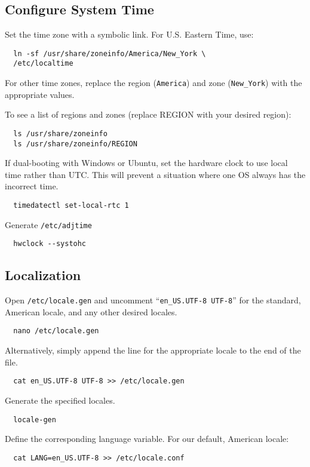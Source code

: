 \documentclass[letterpaper,12pt]{article}
\newcommand{\p}{\par\bigskip}
\begin{document}
\subsection{Configure System Time}
Set the time zone with a symbolic link. For U.S. Eastern Time, use:
\begin{lstlisting}
  ln -sf /usr/share/zoneinfo/America/New_York \
  /etc/localtime
\end{lstlisting} \p
For other time zones, replace the region ({\tt America}) and zone ({\tt New\_York}) with the appropriate values. \par

To see a list of regions and zones (replace REGION with your desired region):
\begin{lstlisting}
  ls /usr/share/zoneinfo
  ls /usr/share/zoneinfo/REGION
\end{lstlisting} \p

If dual-booting with Windows or Ubuntu, set the hardware clock to use local time rather than UTC. This will prevent a situation where one OS always has the incorrect time.
\begin{lstlisting}
  timedatectl set-local-rtc 1
\end{lstlisting} \p

Generate {\tt /etc/adjtime}
\begin{lstlisting}
  hwclock --systohc
\end{lstlisting}


\subsection{Localization}
Open {\tt /etc/locale.gen} and uncomment ``{\tt en\_US.UTF-8 UTF-8}'' for the standard, American locale, and any other desired locales.
\begin{lstlisting}
  nano /etc/locale.gen
\end{lstlisting} \p

Alternatively, simply append the line for the appropriate locale to the end of the file.
\begin{lstlisting}
  cat en_US.UTF-8 UTF-8 >> /etc/locale.gen
\end{lstlisting} \p

Generate the specified locales.
\begin{lstlisting}
  locale-gen
\end{lstlisting} \p

Define the corresponding language variable. For our default, American locale:
\begin{lstlisting}
  cat LANG=en_US.UTF-8 >> /etc/locale.conf
\end{lstlisting}
\end{document}
